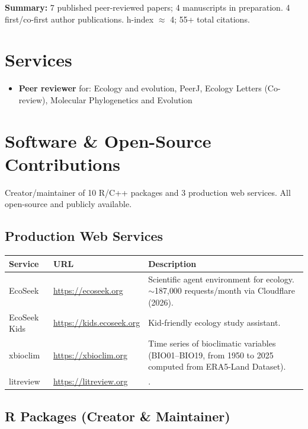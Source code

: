 \documentclass[11pt,a4paper]{article}
\begin{document}
\textbf{Summary:} 7 published peer-reviewed papers; 4 manuscripts in preparation. 4 first/co-first author publications. h-index $\approx$ 4; 55+ total citations.

\section*{Services}
\begin{itemize}

\item
  \textbf{Peer reviewer} for: Ecology and evolution, PeerJ, Ecology Letters (Co-review), Molecular Phylogenetics and Evolution
\end{itemize}




\section*{Software \& Open-Source Contributions}

Creator/maintainer of 10 R/C++ packages and 3 production web services. All open-source and publicly available.

\subsection*{Production Web Services}

\noindent\begin{tabularx}{\linewidth}{@{}p{2.2cm}p{4.8cm}X@{}}
\toprule
\textbf{Service} & \textbf{URL} & \textbf{Description} \\
\midrule
EcoSeek & \url{https://ecoseek.org} & Scientific agent environment for ecology. $\sim$187{,}000 requests/month via Cloudflare (2026). \\
EcoSeek Kids & \url{https://kids.ecoseek.org} & Kid-friendly ecology study assistant. \\
xbioclim & \url{https://xbioclim.org} & Time series of bioclimatic variables (BIO01--BIO19, from  1950 to 2025 computed from ERA5-Land Dataset). \\
litreview & \url{https://litreview.org} & . \\
\bottomrule
\end{tabularx}

\subsection*{R Packages (Creator \& Maintainer)}
\end{document}
